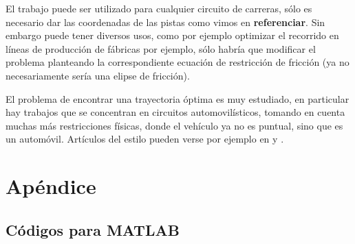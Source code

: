 \documentclass[a4paper,10pt]{book}
\newcommand{\R}{\mathbbm{R}}
\newcommand{\arr}{\rightarrow}
\newcommand{\la}{\langle}
\newcommand{\ra}{\rangle}
\newtheorem{defi}[teo]{Definici\'on}
\newcounter{ejem}[section]
\begin{document}
El trabajo puede ser utilizado para cualquier circuito de carreras, sólo es necesario dar las coordenadas de las pistas como vimos en \textbf{referenciar}. Sin embargo puede tener diversos usos, como por ejemplo optimizar el recorrido en líneas de producción de fábricas por ejemplo, sólo habría que modificar el problema planteando la correspondiente ecuación de restricción de fricción (ya no necesariamente sería una elipse de fricción).

El problema de encontrar una trayectoria óptima es muy estudiado, en particular hay trabajos que se concentran en circuitos automovilísticos, tomando en cuenta muchas más restricciones físicas, donde el vehículo ya no es puntual, sino que es un automóvil. Artículos del estilo pueden verse por ejemplo en \cite{xiong2010racing} y \cite{van2015optimal}. 







\chapter{Apéndice}



\section{Códigos para MATLAB}


% 




\end{document}
